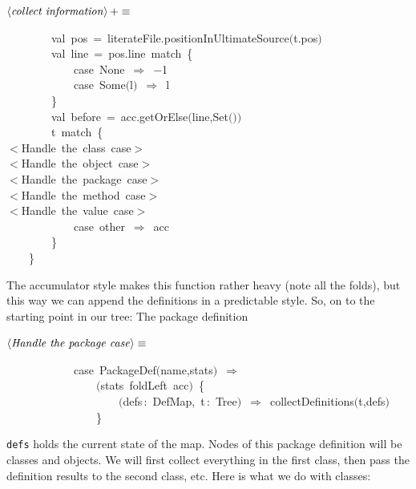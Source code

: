 \documentclass[a4paper,12pt]{article}
\begin{document}
$\left<\mbox{\emph{collect information}}\right>+\equiv$
\begin{program}~~~~~~~~{\vem val}~pos~=~literateFile.positionInUltimateSource$($t.pos$)$
\\~~~~~~~~{\vem val}~line~=~pos.line~{\vem match}~{\small\{}
\\~~~~~~~~~~~~{\vem case}~None~$\Rightarrow$~$-$1
\\~~~~~~~~~~~~{\vem case}~Some$($l$)$~$\Rightarrow$~l
\\~~~~~~~~{\small\}}
\\~~~~~~~~{\vem val}~before~=~acc.getOrElse$($line,Set$($$)$$)$
\\~~~~~~~~t~{\vem match}~{\small\{}
\\$<$Handle~the~{\vem class}~{\vem case}$>$
\\$<$Handle~the~{\vem object}~{\vem case}$>$
\\$<$Handle~the~{\vem package}~{\vem case}$>$
\\$<$Handle~the~method~{\vem case}$>$
\\$<$Handle~the~value~{\vem case}$>$
\\~~~~~~~~~~~~{\vem case}~other~$\Rightarrow$~acc
\\~~~~~~~~{\small\}}
\\~~~~{\small\}}
\\[0.5em]\end{program}


The accumulator style makes this function rather heavy (note all the folds),
but this way we can append the definitions in a predictable style. So, on to the
starting point in our tree: The package definition

$\left<\mbox{\emph{Handle the package case}}\right>\equiv$
\begin{program}~~~~~~~~~~~~{\vem case}~PackageDef$($name,stats$)$~$\Rightarrow$
\\~~~~~~~~~~~~~~~~$($stats~foldLeft~acc$)$~{\small\{}
\\~~~~~~~~~~~~~~~~~~~~$($defs\,{\rm :}~DefMap,~t\,{\rm :}~Tree$)$~$\Rightarrow$~collectDefinitions$($t,defs$)$
\\~~~~~~~~~~~~~~~~{\small\}}
\\[0.5em]\end{program}


\texttt{defs} holds the current state of the map. Nodes of this package definition
will be classes and objects. We will first collect everything in the first class,
then pass the definition results to the second class, etc. Here is what we do with
classes:
\end{document}
